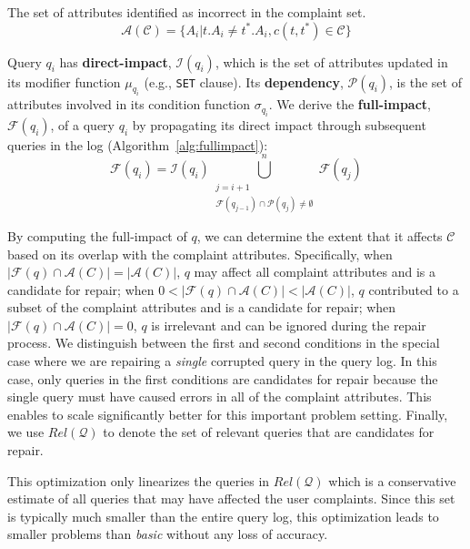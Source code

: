 \begin{definition} 
	The set of attributes identified as incorrect in the complaint set.
	\[\mathcal{A}(\mathcal{C}) = \{A_i | t.A_i \neq t^*.A_i, c(t,t^*) \in \mathcal{C}\}\]
\end{definition} 


\begin{definition}
    Query $q_i$ has \textbf{direct-impact}, $\mathcal{I}(q_i)$, which is
    the set of attributes updated in its modifier function $\mu_{q_i}$
    (e.g., \texttt{SET} clause). Its \textbf{dependency},
    $\mathcal{P}(q_i)$, is the set of attributes involved in its
    condition function $\sigma_{q_i}$.
    We derive the \textbf{full-impact}, $\mathcal{F}(q_i)$, of a query $q_i$ by propagating its direct impact through subsequent queries in the log (Algorithm~\ref{alg:fullimpact}):
    \[
    \mathcal{F}(q_i)=\mathcal{I}(q_i)\bigcup_{\substack{j=i+1\\ \mathcal{F}(q_{j-1})\cap \mathcal{P}(q_j) \neq \emptyset}}^n \mathcal{F}(q_j)
    \]
\end{definition}






By computing the full-impact of $q$, we can determine the extent that it affects $\mathcal{C}$
based on its overlap with the complaint attributes.
Specifically, 
when $|\mathcal{F}(q) \cap \mathcal{A}(C)|=|\mathcal{A}(C)|$, $q$ may affect all complaint attributes and is a candidate for repair; 
when $0 < |\mathcal{F}(q) \cap \mathcal{A}(C)| < |\mathcal{A}(C)|$, 
$q$ contributed to a subset of the complaint attributes and is a candidate for repair;
when $|\mathcal{F}(q) \cap \mathcal{A}(C)|=0$, $q$ is irrelevant 
and can be ignored during the repair process.
We distinguish between the first and second conditions in the special case where we are repairing a \emph{single} 
corrupted query in the query log.  In this case, only queries in the first conditions are candidates for repair because 
the single query must have caused errors in all of the complaint attributes.  This enables \sys to scale significantly better
for this important problem setting. 
Finally, we use $Rel\mathcal{(Q)}$ to denote the set of relevant
queries that are candidates for repair.

This optimization only linearizes the queries in $Rel\mathcal{(Q)}$ which is a conservative estimate of all queries that may have affected the user complaints.  
Since this set is typically much smaller than the entire query log, this optimization leads to smaller problems than \emph{basic} without any loss of accuracy.

